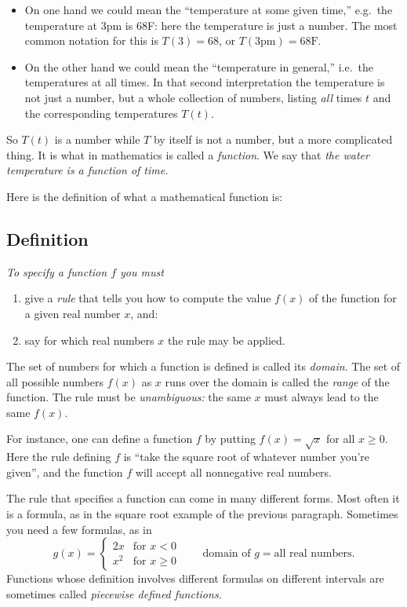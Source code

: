 \begin{itemize}
\item On one hand we could mean the ``temperature at some given
  time,'' e.g.~the temperature at 3pm is 68F: here the temperature is
  just a number.  The most common notation for this is $T(3) = 68$, or
  $T(3\textrm{pm}) = 68\textrm{F}$.

\item On the other hand we could mean the ``temperature in general,''
  i.e.~the temperatures at all times.  In that second interpretation
  the temperature is not just a number, but a whole collection of
  numbers, listing \emph{all} times $t$ and the corresponding
  temperatures $T(t)$.
\end{itemize}

So $T(t)$ is a number while $T$ by itself is not a number, but a more
complicated thing.  It is what in mathematics is called a
\emph{function}.  We say that \textit{the water temperature is a
  function of time.}

Here is the definition of what a mathematical function is:

\subsection{Definition}
\itshape
To specify a \emph{function} $f$ you must 
\begin{enumerate}
\item give a \emph{rule} that tells you how to compute the value $f(x)$ of
  the function for a given real number $x$, and:
\item say for which real numbers $x$ the rule may be applied.
\end{enumerate}%
The set of numbers for which a function is defined is called its \emph{domain}.
The set of all possible numbers $f(x)$ as $x$ runs over the domain is called the
\emph{range} of the function.  The rule must be \emph{unambiguous:} the same
$x$ must always lead to the same $f(x)$.
\upshape

\medskip

For instance, one can define a function $f$ by putting $f(x) = \sqrt x$ for all
$x\geq0$.  Here the rule defining $f$ is ``take the square root of whatever
number you're given'', and the function $f$ will accept all nonnegative real
numbers.

The rule that specifies a function can come in many different forms.  Most
often it is a formula, as in the square root example of the previous paragraph.
Sometimes you need a few formulas, as in
\[
g(x) = 
\begin{cases}
  2x & \text{for } x<0 \\
  x^2 & \text{for }x\geq0
\end{cases}
\qquad
\text{domain of $g$} = \text{all real numbers.}
\]
Functions whose definition involves different formulas on different
intervals are sometimes called \emph{piecewise defined functions.}

